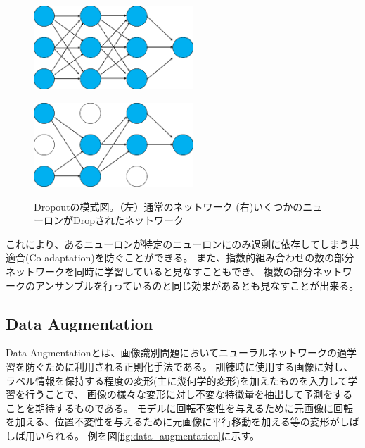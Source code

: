 \begin{figure}[tbp]
    \begin{minipage}{0.5\hsize}
     \begin{center}
      \includegraphics[width=60mm]{figures/standard_network.png}
     \end{center}
     \label{fig:one}
    \end{minipage}
    \begin{minipage}{0.5\hsize}
     \begin{center}
      \includegraphics[width=60mm]{figures/dropout_network.png}
     \end{center}
     \label{fig:two}
    \end{minipage}
    \caption{\label{fig:dropout_network}Dropoutの模式図。（左）通常のネットワーク (右)いくつかのニューロンがDropされたネットワーク}
    
\end{figure}

これにより、あるニューロンが特定のニューロンにのみ過剰に依存してしまう共適合(Co-adaptation)を防ぐことができる。
また、指数的組み合わせの数の部分ネットワークを同時に学習していると見なすこともでき、
複数の部分ネットワークのアンサンブルを行っているのと同じ効果があるとも見なすことが出来る。

\subsection{Data Augmentation}

Data Augmentationとは、画像識別問題においてニューラルネットワークの過学習を防ぐために利用される正則化手法である。
訓練時に使用する画像に対し、ラベル情報を保持する程度の変形(主に幾何学的変形)を加えたものを入力して学習を行うことで、
画像の様々な変形に対し不変な特徴量を抽出して予測をすることを期待するものである。
モデルに回転不変性を与えるために元画像に回転を加える、位置不変性を与えるために元画像に平行移動を加える等の変形がしばしば用いられる。
例を図\ref{fig:data_augmentation}に示す。

